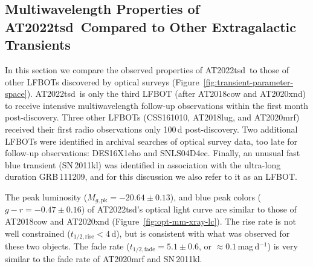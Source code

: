 \documentclass{nature_plusfigure}
\newcommand{\at}{AT2022tsd}
\begin{document}
\begin{methods}
\section{Multiwavelength Properties of \at\ Compared to Other Extragalactic Transients}
\label{sec:multiwavelength-properties}

In this section we compare the observed properties of \at\ to those of other LFBOTs discovered by optical surveys (Figure~\ref{fig:transient-parameter-space}).
\at\ is only the third LFBOT (after AT2018cow\cite{Prentice2018,Perley2019} and AT2020xnd\cite{Perley2021}) to receive intensive multiwavelength follow-up observations within the first month post-discovery.
Three other LFBOTs (CSS161010\cite{Coppejans2020}, AT2018lug\cite{Ho2020_Koala}, and AT2020mrf\cite{Yao2022}) received their first radio observations only 100\,d post-discovery. Two additional LFBOTs were identified in archival searches of optical survey data, too late for follow-up observations: DES16X1eho\cite{Pursiainen2018} and SNLS04D4ec\cite{Arcavi2016}. Finally, an unusual fast blue transient (SN\,2011kl) was identified in association with the ultra-long duration GRB\,111209\cite{Greiner2015}, and for this discussion we also refer to it as an LFBOT.

The peak luminosity ($M_{g,\mathrm{pk}}=-20.64\pm0.13$), and blue peak colors ($g-r=-0.47\pm0.16$) of \at's optical light curve are similar to those of AT2018cow\cite{Prentice2018,Perley2019} and AT2020xnd\cite{Perley2021} (Figure~\ref{fig:opt-mm-xray-lc}).
The rise rate is not well constrained ($t_{1/2,\mathrm{rise}}<4\,$d), but is consistent with what was observed for these two objects.
The fade rate ($t_{1/2,\mathrm{fade}}=5.1\pm0.6$, or $\approx0.1\,$mag\,d$^{-1}$) is very similar to the fade rate of AT2020mrf\cite{Yao2022} and SN\,2011kl.



\end{methods}
\end{document}
